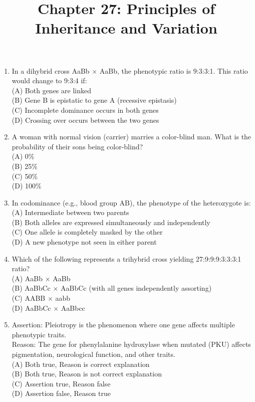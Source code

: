 \documentclass{article}
\begin{document}
\title{Chapter 27: Principles of Inheritance and Variation}
\date{}
\maketitle

\begin{enumerate}[label=Q\arabic*.]

\item In a dihybrid cross AaBb $\times$ AaBb, the phenotypic ratio is 9:3:3:1. This ratio would change to 9:3:4 if:
\\(A) Both genes are linked
\\(B) Gene B is epistatic to gene A (recessive epistasis)
\\(C) Incomplete dominance occurs in both genes
\\(D) Crossing over occurs between the two genes

\item A woman with normal vision (carrier) marries a color-blind man. What is the probability of their sons being color-blind?
\\(A) 0\%
\\(B) 25\%
\\(C) 50\%
\\(D) 100\%

\item In codominance (e.g., blood group AB), the phenotype of the heterozygote is:
\\(A) Intermediate between two parents
\\(B) Both alleles are expressed simultaneously and independently
\\(C) One allele is completely masked by the other
\\(D) A new phenotype not seen in either parent

\item Which of the following represents a trihybrid cross yielding 27:9:9:9:3:3:3:1 ratio?
\\(A) AaBb $\times$ AaBb
\\(B) AaBbCc $\times$ AaBbCc (with all genes independently assorting)
\\(C) AABB $\times$ aabb
\\(D) AaBbCc $\times$ AaBbcc

\item Assertion: Pleiotropy is the phenomenon where one gene affects multiple phenotypic traits.\\
Reason: The gene for phenylalanine hydroxylase when mutated (PKU) affects pigmentation, neurological function, and other traits.
\\(A) Both true, Reason is correct explanation
\\(B) Both true, Reason is not correct explanation
\\(C) Assertion true, Reason false
\\(D) Assertion false, Reason true


\end{enumerate}
\end{document}
